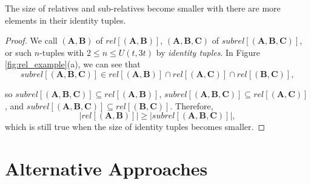 \begin{thm}
The size of relatives and sub-relatives become smaller with there
are more elements in their identity tuples. \label{theo:size_rel}
\end{thm}
\begin{proof}
We call $\left(\boldsymbol{A},\boldsymbol{B}\right)$ of $rel\left[\left(\boldsymbol{A},\boldsymbol{B}\right)\right]$,
$\left(\boldsymbol{A},\boldsymbol{B},\boldsymbol{C}\right)$ of $subrel\left[\left(\boldsymbol{A},\boldsymbol{B},\boldsymbol{C}\right)\right]$,
or such $n$-tuples with $2\leq n\leq U\left(t,3t\right)$ by \textit{identity
tuples}. In Figure \ref{fig:rel_example}(a), we can see that 
\[
subrel\left[\left(\boldsymbol{A},\boldsymbol{B},\boldsymbol{C}\right)\right]\in rel\left[\left(\boldsymbol{A},\boldsymbol{B}\right)\right]\cap rel\left[\left(\boldsymbol{A},\boldsymbol{C}\right)\right]\cap rel\left[\left(\boldsymbol{B},\boldsymbol{C}\right)\right],
\]

so $subrel\left[\left(\boldsymbol{A},\boldsymbol{B},\boldsymbol{C}\right)\right]\subseteq rel\left[\left(\boldsymbol{A},\boldsymbol{B}\right)\right]$,
$subrel\left[\left(\boldsymbol{A},\boldsymbol{B},\boldsymbol{C}\right)\right]\subseteq rel\left[\left(\boldsymbol{A},\boldsymbol{C}\right)\right]$,
and $subrel\left[\left(\boldsymbol{A},\boldsymbol{B},\boldsymbol{C}\right)\right]\subseteq rel\left[\left(\boldsymbol{B},\boldsymbol{C}\right)\right]$.
Therefore,
\[
\left|rel\left[\left(\boldsymbol{A},\boldsymbol{B}\right)\right]\right|\geq\left|subrel\left[\left(\boldsymbol{A},\boldsymbol{B},\boldsymbol{C}\right)\right]\right|,
\]
which is still true when the size of identity tuples becomes smaller.
\end{proof}

\section{Alternative Approaches \label{sec:Alternative-Approaches}}

